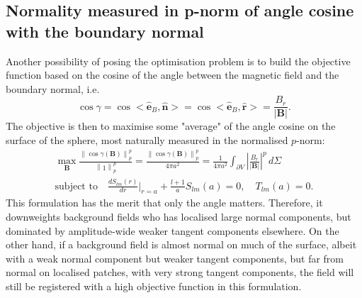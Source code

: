 \documentclass[a4paper, 11pt]{article}
\begin{document}


\subsection{Normality measured in p-norm of angle cosine with the boundary normal}

Another possibility of posing the optimisation problem is to build the objective function based on the cosine of the angle between the magnetic field and the boundary normal, i.e. 
\[
    \cos\gamma = \cos <\hat{\mathbf{e}}_B, \hat{\mathbf{n}}> = \cos <\hat{\mathbf{e}}_B, \hat{\mathbf{r}}> = \frac{B_r}{|\mathbf{B}|}.
\]
The objective is then to maximise some "average" of the angle cosine on the surface of the sphere, most naturally measured in the normalised $p$-norm:
\begin{equation}
\begin{gathered}
    \max_{\mathbf{B}} \frac{\left\| \cos \gamma(\mathbf{B}) \right\|_p^p}{\left\| 1 \right\|_p^p} = \frac{\left\| \cos \gamma(\mathbf{B}) \right\|_p^p}{4\pi a^2} = \frac{1}{4\pi a^2} \int_{\partial V} \left|\frac{B_r}{|\mathbf{B}|}\right|^p \, d\Sigma \\ 
    \text{subject to} \quad \frac{dS_{lm}(r)}{dr} \bigg|_{r=a} + \frac{l+1}{a} S_{lm}(a) = 0,\quad T_{lm}(a) = 0.
\end{gathered}
\end{equation}
This formulation has the merit that only the angle matters. Therefore, it downweights background fields who has localised large normal components, but dominated by amplitude-wide weaker tangent components elsewhere. On the other hand, if a background field is almost normal on much of the surface, albeit with a weak normal component but weaker tangent components, but far from normal on localised patches, with very strong tangent components, the field will still be registered with a high objective function in this formulation.
\end{document}
